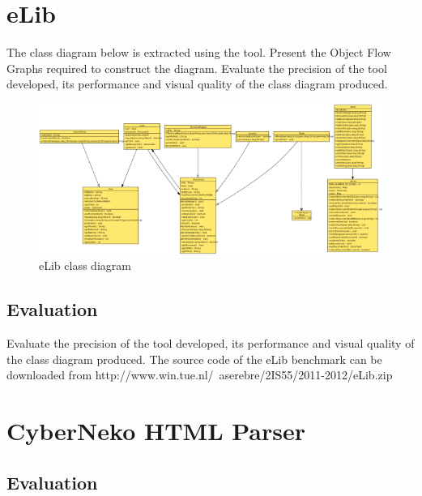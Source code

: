 \section{eLib}
The class diagram below is extracted using the tool. Present the Object Flow Graphs required to construct the diagram. Evaluate the precision of the tool developed, its performance and visual quality of the class diagram produced.
 
\begin{figure}[h!]
  \begin{center}
    \includegraphics[width=1.0\textwidth]{figures/eLib.png}
  \end{center}
  \caption{eLib class diagram}
\end{figure} 

\subsection{Evaluation}

Evaluate the precision of the tool developed, its performance and visual quality of the class diagram produced. The source code of the eLib benchmark can be downloaded from http://www.win.tue.nl/~aserebre/2IS55/2011-2012/eLib.zip

\section{CyberNeko HTML Parser}

\subsection{Evaluation}